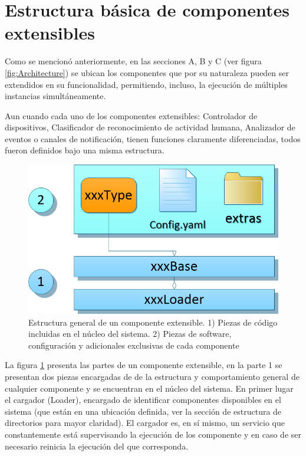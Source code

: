     \newpage

\section{Estructura básica de componentes extensibles}
\label{Sec:ComponentStructure}
    Como se mencionó anteriormente, en las secciones A, B y C (ver figura \ref{fig:Architecture}) se ubican los componentes que por su naturaleza pueden ser extendidos en su funcionalidad, permitiendo, incluso, la ejecución de múltiples instancias simultáneamente.
    
    Aun cuando cada uno de los componentes extensibles: Controlador de dispositivos, Clasificador de reconocimiento de actividad humana, Analizador de eventos o canales de notificación, tienen funciones claramente diferenciadas, todos fueron definidos bajo una misma estructura.
    
    \begin{figure}[ht!]
    	\centering
    	\includegraphics[width=0.8\linewidth]{imgs/03-Architecture/03-ComponentStructure.png}
    	\caption[Estructura general de un componente extensible]{Estructura general de un componente extensible. 1) Piezas de código incluidas en el núcleo del sistema. 2) Piezas de software, configuración y adicionales exclusivas de cada componente}
	    \label{fig:ComponentStructure}
    \end{figure}%
    
    La figura \ref{fig:ComponentStructure} presenta las partes de un componente extensible, en la parte 1 se presentan dos piezas encargadas de de la estructura y comportamiento general de cualquier componente y se encuentran en el núcleo del sistema. En primer lugar el cargador (Loader), encargado de identificar componentes disponibles en el sistema (que están en una ubicación definida, ver la sección de estructura de directorios para mayor claridad). El cargador es, en sí mismo, un servicio que constantemente está supervisando la ejecución de los componente y en caso de ser necesario reinicia la ejecución del que corresponda.
    
